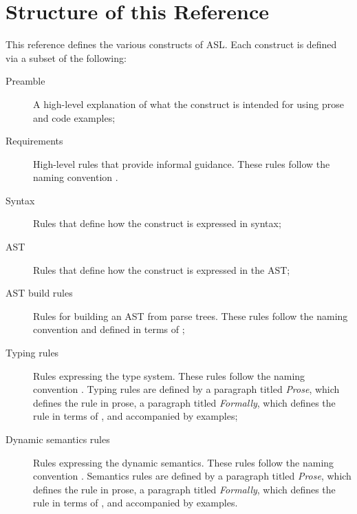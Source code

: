 
\section{Structure of this Reference}
This reference defines the various constructs of ASL.
Each construct is defined via a subset of the following:
\begin{description}
    \item[Preamble] A high-level explanation of what the construct is intended for using
        prose and code examples;
    \item[Requirements] High-level rules that provide informal guidance.
        These rules follow the naming convention .
    \item[Syntax] Rules that define how the construct is expressed in syntax;
    \item[AST] Rules that define how the construct is expressed in the AST;
    \item[AST build rules] Rules for building an AST from parse trees.
        These rules follow the naming convention 
        and defined in terms of \inferencerules;
    \item[Typing rules] Rules expressing the type system.
        These rules follow the naming convention .
        Typing rules are defined by a paragraph titled \emph{Prose},
        which defines the rule in prose,
        a paragraph titled \emph{Formally}, which defines the rule in terms of \inferencerules,
        and accompanied by examples;
    \item[Dynamic semantics rules] Rules expressing the dynamic semantics.
        These rules follow the naming convention .
        Semantics rules are defined by a paragraph titled \emph{Prose},
        which defines the rule in prose,
        a paragraph titled \emph{Formally}, which defines the rule in terms of \inferencerules,
        and accompanied by examples.
\end{description}

